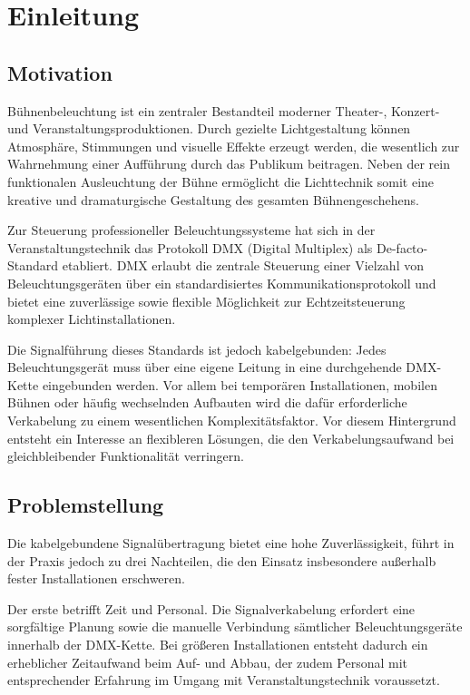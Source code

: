 \chapter{Einleitung}
\label{chap:einleitung}

\section{Motivation}
\label{sec:motivation}

Bühnenbeleuchtung ist ein zentraler Bestandteil moderner Theater-, Konzert- und
Veranstaltungsproduktionen. Durch gezielte Lichtgestaltung können Atmosphäre,
Stimmungen und visuelle Effekte erzeugt werden, die wesentlich zur Wahrnehmung
einer Aufführung durch das Publikum beitragen. Neben der rein funktionalen
Ausleuchtung der Bühne ermöglicht die Lichttechnik somit eine kreative und
dramaturgische Gestaltung des gesamten Bühnengeschehens.

Zur Steuerung professioneller Beleuchtungssysteme hat sich in der
Veranstaltungstechnik das Protokoll DMX (Digital Multiplex) als De-facto-Standard
etabliert. DMX erlaubt die zentrale Steuerung einer Vielzahl von
Beleuchtungsgeräten über ein standardisiertes Kommunikationsprotokoll und bietet
eine zuverlässige sowie flexible Möglichkeit zur Echtzeitsteuerung komplexer
Lichtinstallationen.

Die Signalführung dieses Standards ist jedoch kabelgebunden: Jedes
Beleuchtungsgerät muss über eine eigene Leitung in eine durchgehende DMX-Kette
eingebunden werden. Vor allem bei temporären Installationen, mobilen Bühnen oder
häufig wechselnden Aufbauten wird die dafür erforderliche Verkabelung zu einem
wesentlichen Komplexitätsfaktor. Vor diesem Hintergrund entsteht ein Interesse an
flexibleren Lösungen, die den Verkabelungsaufwand bei gleichbleibender
Funktionalität verringern.

\section{Problemstellung}
\label{sec:problemstellung}

Die kabelgebundene Signalübertragung bietet eine hohe Zuverlässigkeit, führt in
der Praxis jedoch zu drei Nachteilen, die den Einsatz insbesondere außerhalb
fester Installationen erschweren.

Der erste betrifft Zeit und Personal. Die Signalverkabelung erfordert eine
sorgfältige Planung sowie die manuelle Verbindung sämtlicher Beleuchtungsgeräte
innerhalb der DMX-Kette. Bei größeren Installationen entsteht dadurch ein
erheblicher Zeitaufwand beim Auf- und Abbau, der zudem Personal mit
entsprechender Erfahrung im Umgang mit Veranstaltungstechnik voraussetzt.

